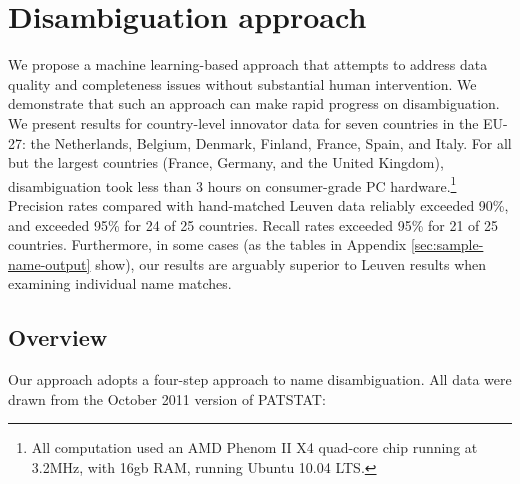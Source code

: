 \documentclass[11pt]{article}
\begin{document}

\section{Disambiguation approach}
\label{sec:disamb-appr}

We propose a machine learning-based approach that attempts to address
data quality and completeness issues without substantial human
intervention. We demonstrate that such an approach can make rapid
progress on disambiguation. We present results for country-level
innovator data for seven countries in the EU-27: the Netherlands,
Belgium, Denmark, Finland, France, Spain, and Italy. For all but the
largest countries (France, Germany, and the United Kingdom),
disambiguation took less than 3 hours on consumer-grade PC
hardware.\footnote{All computation used an AMD Phenom II X4 quad-core
chip running at 3.2MHz, with 16gb RAM, running Ubuntu 10.04 LTS.}
Precision rates compared with hand-matched Leuven data reliably
exceeded 90\%, and exceeded 95\% for 24 of 25 countries. Recall rates
exceeded 95\% for 21 of 25 countries. Furthermore, in some cases (as
the tables in Appendix \ref{sec:sample-name-output} show), our results
are arguably superior to Leuven results when examining individual name
matches.

\subsection{Overview}
\label{sec:overview}

Our approach adopts a four-step approach to name disambiguation. All
data were drawn from the October 2011 version of PATSTAT:
\end{document}
